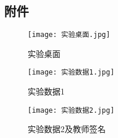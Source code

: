 \documentclass[dvipsnames, svgnames,a4paper,11pt]{article}
\begin{document}
	\subsection{附件}
	\begin{figure}[H]
		\centering
		\begin{minipage}{0.3\linewidth}
			\centering
			\texttt{[image: 实验桌面.jpg]}
			\caption{实验桌面}
		\end{minipage}
		\hfill
		\begin{minipage}{0.3\linewidth}
			\centering
			\texttt{[image: 实验数据1.jpg]}
			\caption{实验数据1}
		\end{minipage}
		\hfill
		\begin{minipage}{0.3\linewidth}
			\centering
			\texttt{[image: 实验数据2.jpg]}
			\caption{实验数据2及教师签名}
		\end{minipage}
	\end{figure}
	
	
	
	
\end{document}
